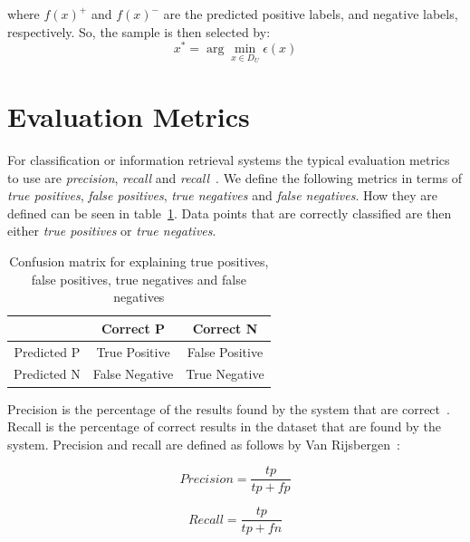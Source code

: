 where $f(x)^+$ and $f(x)^-$ are the predicted positive labels, and negative labels, respectively.
So, the sample is then selected by:
\begin{equation}
    x^* = \arg \min_{x \in D_U} \epsilon(x)
\end{equation}

\section{Evaluation Metrics}\label{sec:evaluation-metrics}

For classification or information retrieval systems the typical evaluation metrics to use are \textit{precision}, \textit{recall} and \textit{recall}~\cite{jiang2012information}.
We define the following metrics in terms of \textit{true positives}, \textit{false positives}, \textit{true negatives} and \textit{false negatives}.
How they are defined can be seen in table~\ref{tab:conf-matr}.
Data points that are correctly classified are then either \textit{true positives} or \textit{true negatives}.

\begin{table}[!ht]
    \begin{center}
        \begin{tabular}{c c c}
            & Correct P & Correct N \\
            \toprule
            Predicted P & True Positive & False Positive \\
            Predicted N & False Negative & True Negative \\
        \end{tabular}
    \end{center}
    \caption{Confusion matrix for explaining true positives, false positives, true negatives and false negatives}\label{tab:conf-matr}
\end{table}

Precision is the percentage of the results found by the system that are correct~\cite{tjong2003introduction}.
Recall is the percentage of correct results in the dataset that are found by the system.
Precision and recall are defined as follows by Van Rijsbergen~\cite{rijsenbergen1979information}:

\begin{equation}
    Precision = \frac{tp}{tp+fp}
\end{equation}

\begin{equation}
    Recall = \frac{tp}{tp+fn}
\end{equation}

